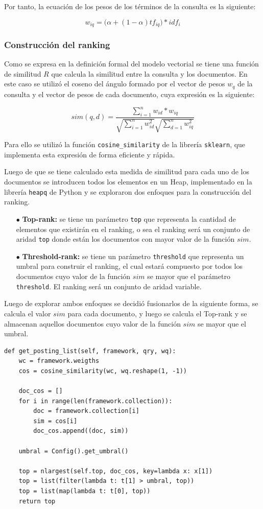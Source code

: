 Por tanto, la ecuación de los pesos de los términos de la consulta es la siguiente:

$$ w_{iq} = \bigg(\alpha + (1 -\alpha) tf_{iq}\bigg) * idf_i  $$

\subsubsection{Construcción del ranking}

Como se expresa en la definición formal del modelo vectorial se tiene una función de similitud $R$ que calcula la similitud entre la consulta y los documentos. En este caso se utilizó el coseno del ángulo formado por el vector de pesos $w_q$ de la consulta y el vector de pesos de cada documento, cuya expresión es la siguiente:

$$ sim(q, d) = \frac{\sum_{i = 1}^n w_{id} * w_{iq}}{\sqrt{\sum_{i=1}^n w_{id}^2} \sqrt{\sum_{d=1}^n w_{iq}^2}} $$

Para ello se utilizó la función \verb|cosine_similarity| \cite{cos} de la librería \verb|sklearn|, que implementa esta expresión de forma eficiente y rápida.

Luego de que se tiene calculado esta medida de similitud para cada uno de los documentos se introducen todos los elementos en un Heap, implementado en la librería \verb|heapq| de Python y se exploraron dos enfoques para la construcción del ranking.

\begin{enumerate}
    \item[$\bullet$] \textbf{Top-rank:} se tiene un parámetro \verb|top| que representa la cantidad de elementos que existirán en el ranking, o sea el ranking será un conjunto de aridad \verb|top| donde están los documentos con mayor valor de la función $sim$.
    \item[$\bullet$] \textbf{Threshold-rank:} se tiene un parámetro \verb|threshold| que representa un umbral para construir el ranking, el cual estará compuesto por todos los documentos cuyo valor de la función $sim$ se mayor que el parámetro \verb|threshold|. El ranking será un conjunto de aridad variable. 
\end{enumerate}

Luego de explorar ambos enfoques se decidió fusionarlos de la siguiente forma, se calcula el valor $sim$ para cada documento, y luego se calcula el Top-rank y se almacenan aquellos documentos cuyo valor de la función $sim$ se mayor que el umbral. 

\begin{verbatim}
def get_posting_list(self, framework, qry, wq):
    wc = framework.weigths
    cos = cosine_similarity(wc, wq.reshape(1, -1))

    doc_cos = []
    for i in range(len(framework.collection)):
        doc = framework.collection[i]
        sim = cos[i]
        doc_cos.append((doc, sim))

    umbral = Config().get_umbral()

    top = nlargest(self.top, doc_cos, key=lambda x: x[1])
    top = list(filter(lambda t: t[1] > umbral, top))
    top = list(map(lambda t: t[0], top))
    return top
\end{verbatim}

